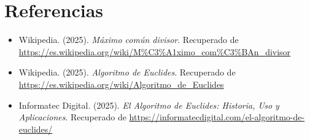 \documentclass{article}
\begin{document}
\section{Referencias}
\begin{itemize}
    \item Wikipedia. (2025). \textit{Máximo común divisor}. Recuperado de \url{https://es.wikipedia.org/wiki/M\%C3\%A1ximo_com\%C3\%BAn_divisor}
    \item Wikipedia. (2025). \textit{Algoritmo de Euclides}. Recuperado de \url{https://es.wikipedia.org/wiki/Algoritmo_de_Euclides}
    \item Informatec Digital. (2025). \textit{El Algoritmo de Euclides: Historia, Uso y Aplicaciones}. Recuperado de \url{https://informatecdigital.com/el-algoritmo-de-euclides/}
\end{itemize}
	
%
%
%
			
\end{document}
